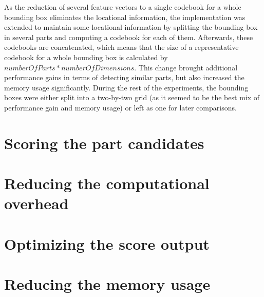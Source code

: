 \par
As the reduction of several feature vectors to a single codebook for a whole bounding box eliminates the locational information, the implementation was extended to maintain some locational information by splitting the bounding box in several parts and computing a codebook for each of them. Afterwards, these codebooks are concatenated, which means that the size of a representative codebook for a whole bounding box is calculated by $numberOfParts * numberOfDimensions$. This change brought additional performance gains in terms of detecting similar parts, but also increased the memory usage significantly. During the rest of the experiments, the bounding boxes were either split into a two-by-two grid (as it seemed to be the best mix of performance gain and memory usage) or left as one for later comparisons.

\section{Scoring the part candidates}


\section{Reducing the computational overhead}


\section{Optimizing the score output}


\section{Reducing the memory usage}

